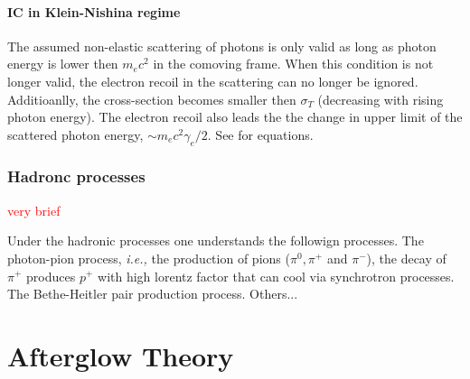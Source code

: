 \documentclass[11pt,a4paper,headinclude=true,DIV=14,BCOR=8mm,chapterprefix,listof=totoc,twoside,openright,abstracton]{scrbook}
\newcommand{\red}[1]{\textcolor{red}{#1}}
\begin{document}
\paragraph{IC in Klein-Nishina regime}

The assumed non-elastic scattering of photons is only valid as long as photon energy is lower then $m_e c^2$ in the comoving frame. When this condition is not longer valid, the electron recoil in the scattering can no longer be ignored. Additioanlly, the cross-section becomes smaller then $\sigma_T$ (decreasing with rising photon energy). 
The electron recoil also leads the the change in upper limit of the scattered photon energy, $\sim m_e c^2 \gamma_e / 2$. See \cite{RubikiLightmann1979} for equations.


\subsubsection{Hadronc processes}
\red{very brief}

Under the hadronic processes one understands the followign processes.
The photon-pion process, \textit{i.e.,} the production of pions ($\pi^0, \pi^+$ and $\pi^-$), the decay of $\pi^+$ produces $p^+$ with high lorentz factor that can cool via synchrotron processes.
The Bethe-Heitler pair production process.
Others...


\section{Afterglow Theory}



\newpage


\end{document}
